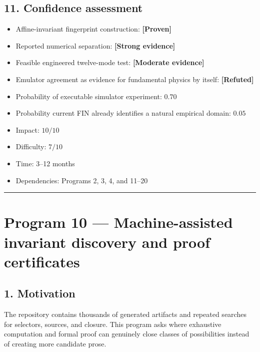 \documentclass[11pt,a4paper,openany]{report}
\newcommand{\statusProven}{\textcolor{fingreen}{[Proven]}}
\newcommand{\statusStrong}{\textcolor{finblue}{[Strong evidence]}}
\newcommand{\statusModerate}{\textcolor{finviolet}{[Moderate evidence]}}
\newcommand{\statusRefuted}{\textcolor{finred}{[Refuted]}}
\begin{document}
\section{11. Confidence assessment}

\begin{itemize}
\item 
Affine-invariant fingerprint construction: \textbf{\statusProven{}}

\item 
Reported numerical separation: \textbf{\statusStrong{}}

\item 
Feasible engineered twelve-mode test: \textbf{\statusModerate{}}

\item 
Emulator agreement as evidence for fundamental physics by itself: \textbf{\statusRefuted{}}

\item 
Probability of executable simulator experiment: \(0.70\)

\item 
Probability current FIN already identifies a natural empirical domain: \(0.05\)

\item 
Impact: \(10/10\)

\item 
Difficulty: \(7/10\)

\item 
Time: 3–12 months

\item 
Dependencies: Programs 2, 3, 4, and 11–20

\end{itemize}

\par\medskip\hrule\medskip

\chapter{Program 10 — Machine-assisted invariant discovery and proof certificates}

\section{1. Motivation}

The repository contains thousands of generated artifacts and repeated searches for selectors, sources, and closure. This program asks where exhaustive computation and formal proof can genuinely close classes of possibilities instead of creating more candidate prose.
\end{document}

